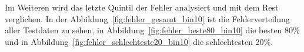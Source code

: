 \documentclass[pdftex,a4paper,halfparskip, article]{scrartcl}
\begin{document}

Im Weiteren wird das letzte Quintil der Fehler analysiert und mit dem Rest verglichen. In der Abbildung~\ref{fig:fehler_gesamt_bin10} ist die Fehlerverteilung aller Testdaten zu sehen, in Abbildung~\ref{fig:fehler_beste80_bin10} die besten 80\% und in Abbildung~\ref{fig:fehler_schlechteste20_bin10} die schlechtesten 20\%. 
\end{document}
